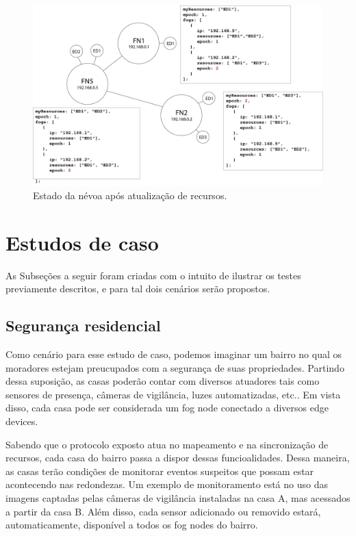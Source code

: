 \begin{figure}[H]
    \centering\includegraphics[width=.8\textwidth]{fig11.png} 
    \caption[Estado da névoa após atualização de recursos]
    {\label{fig:fig11} Estado da névoa após atualização de recursos.}
\end{figure}


\section{Estudos de caso}

As Subseções a seguir foram criadas com o intuito de ilustrar os testes previamente descritos, e para tal dois cenários serão propostos.

\subsection{Segurança residencial}

Como cenário para esse estudo de caso, podemos imaginar um bairro no qual os moradores estejam preucupados com a segurança de suas propriedades.
Partindo dessa suposição, as casas poderão contar com diversos atuadores tais como sensores de presença, câmeras de vigilância, luzes automatizadas, etc..
Em vista disso, cada casa pode ser considerada um fog node conectado a diversos edge devices.

Sabendo que o protocolo exposto atua no mapeamento e na sincronização de recursos, cada casa do bairro passa a dispor dessas funcioalidades.
Dessa maneira, as casas terão condições de monitorar eventos suspeitos que possam estar acontecendo nas redondezas.
Um exemplo de monitoramento está no uso das imagens captadas pelas câmeras de vigilância instaladas na casa A, mas acessados a partir da casa B.
Além disso, cada sensor adicionado ou removido estará, automaticamente, disponível a todos os fog nodes do bairro.


